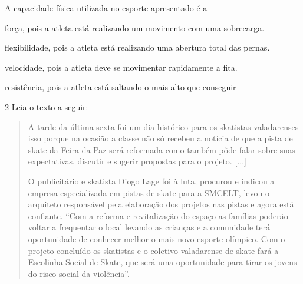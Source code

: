 A capacidade física utilizada no esporte apresentado é a

\begin{escolha}
\item força, pois a atleta está realizando um movimento com uma sobrecarga.

\item flexibilidade, pois a atleta está realizando uma abertura total das
pernas.

\item velocidade, pois a atleta deve se movimentar rapidamente a fita.

\item resistência, pois a atleta está saltando o mais alto que conseguir
\end{escolha}


\num{2} Leia o texto a seguir:

\begin{quote}
A tarde da última sexta foi um dia histórico para os skatistas
valadarenses isso porque na ocasião a classe não só recebeu a notícia de
que a pista de skate da Feira da Paz será reformada como também pôde
falar sobre suas expectativas, discutir e sugerir propostas para o
projeto. {[}...{]}

O publicitário e skatista Diogo Lage foi à luta, procurou e indicou a
empresa especializada em pistas de skate para a SMCELT, levou o
arquiteto responsável pela elaboração dos projetos nas pistas e agora
está confiante. ``Com a reforma e revitalização do espaço as famílias
poderão voltar a frequentar o local levando as crianças e a comunidade
terá oportunidade de conhecer melhor o mais novo esporte olímpico. Com o
projeto concluído os skatistas e o coletivo valadarense de skate fará a
Escolinha Social de Skate, que será uma oportunidade para tirar os
jovens do risco social da violência''.

\end{quote}

